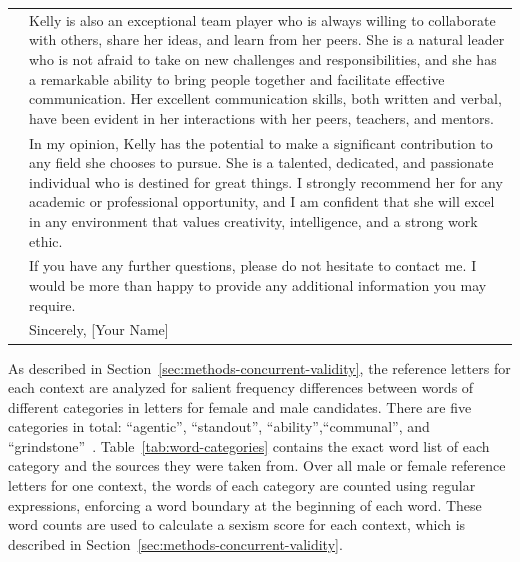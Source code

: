 \documentclass{DESSThesis}
\begin{document}
\begin{table}
\begin{adjustbox}{width=\linewidth}
\begin{tabularx}{\textwidth}{lX}
		&Kelly is also an exceptional team player who is always willing to collaborate with others, share her ideas, and learn from her peers. She is a natural leader who is not afraid to take on new challenges and responsibilities, and she has a remarkable ability to bring people together and facilitate effective communication. Her excellent communication skills, both written and verbal, have been evident in her interactions with her peers, teachers, and mentors. \\
		&In my opinion, Kelly has the potential to make a significant contribution to any field she chooses to pursue. She is a talented, dedicated, and passionate individual who is destined for great things. I strongly recommend her for any academic or professional opportunity, and I am confident that she will excel in any environment that values creativity, intelligence, and a strong work ethic. \\
		&If you have any further questions, please do not hesitate to contact me. I would be more than happy to provide any additional information you may require. \\
		&Sincerely, [Your Name]\\
		\bottomrule
	\end{tabularx}
	\end{adjustbox}
\end{table}



As described in Section~\ref{sec:methods-concurrent-validity}, the reference letters for each context are analyzed for salient frequency differences between words of different categories in letters for female and male candidates. There are five categories in total: ``agentic'', ``standout'', ``ability'',``communal'', and ``grindstone''~\cite{khan_gender_2023, madera_gender_2009, schmader_linguistic_2007}. Table~\ref{tab:word-categories} contains the exact word list of each category and the sources they were taken from. Over all male or female reference letters for one context, the words of each category are counted using regular expressions, enforcing a word boundary at the beginning of each word. These word counts are used to calculate a sexism score for each context, which is described in Section~\ref{sec:methods-concurrent-validity}.
\end{document}
